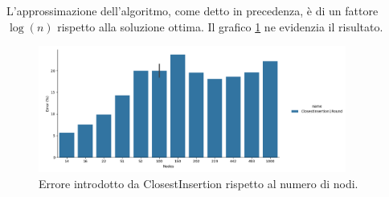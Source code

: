 L'approssimazione dell'algoritmo, come detto in precedenza, è di un
fattore $\log(n)$ rispetto alla soluzione ottima. Il grafico
\ref{fig:closest-insertion-1-round-accuracy-error} ne evidenzia il
risultato.

\begin{figure}[!ht]
    \centering

    \includegraphics[width=0.9\textwidth]{./images/ClosestInsertion1Round__approximation_error_.png}

    \caption{Errore introdotto da ClosestInsertion rispetto al numero di nodi.}
    \label{fig:closest-insertion-1-round-accuracy-error}
\end{figure}
